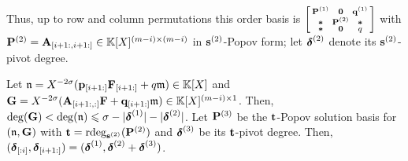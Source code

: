 \documentclass[preprint]{sig-alternate-05-2015}
\begin{document}
\vspace{-0.15cm}
Thus, up to row and column permutations this order basis is
$\left[\begin{smallmatrix}
    \msb^{(1)} & \mat{0} & \col{q}^{(1)} \\
    \anyMat & \msb^{(2)} & \anyMat \\ \anyMat & \mat{0} & q
\end{smallmatrix}\right]$
with $\msb^{(2)} = \subMat{\mat{A}}{i+1}{}{i+1}{} \in \polMatSpace[(\nbun-i)]$ in
$\shifts^{(2)}$-Popov form; let $\minDegs^{(2)}$ denote its
$\shifts^{(2)}$-pivot degree.

\vspace{-0.1cm}
\begin{lem}
  \label{lem:one:obtain_degrees}
  Let $\modulus[n] = X^{-2\degMod} (\subVec{\row{p}}{i+1}{}
  \subVec{\sys}{i+1}{} + q \modulus) \in \polRing$ and $\mat{G} = X^{-2\degMod}
  (\subMat{\mat{A}}{i+1}{}{}{} \sys + \subVec{\col{q}}{i+1}{}
  \modulus) \in \polMatSpace[(\nbun-i)][1]$. Then, $\deg(\mat{G}) <
  \deg(\mathfrak{n}) \le \degMod - \sumVec{\minDegs^{(1)}} -
  \sumVec{\minDegs^{(2)}}$.
  Let $\msb^{(3)}$ be the $\shifts[t]$-Popov solution basis for
  $(\modulus[n],\mat{G})$ with $\shifts[t] = \rdeg[\shifts^{(2)}]{\msb^{(2)}}$
  and $\minDegs^{(3)}$ be its $\shifts[t]$-pivot degree. Then,
  $(\subVec{\minDegs}{}{i},\subVec{\minDegs}{i+1}{}) =
  (\minDegs^{(1)},\minDegs^{(2)} + \minDegs^{(3)})$.
\end{lem}
\end{document}
